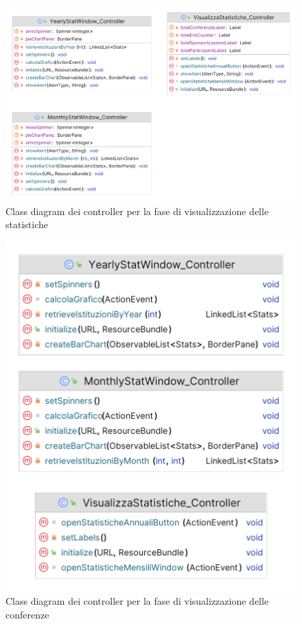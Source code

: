 \begin{figure}[h!]
	\includegraphics[scale=0.2]{Immagini/Controller_Statistiche.png}
	\caption{Class diagram dei controller per la fase di visualizzazione delle statistiche}
\end{figure}
\newpage
\begin{figure}[h!]
	\centering
	\includegraphics[scale=0.25]{Immagini/Controller_Visualizzazione.png}
	\caption{Class diagram dei controller per la fase di visualizzazione delle conferenze}
\end{figure}
